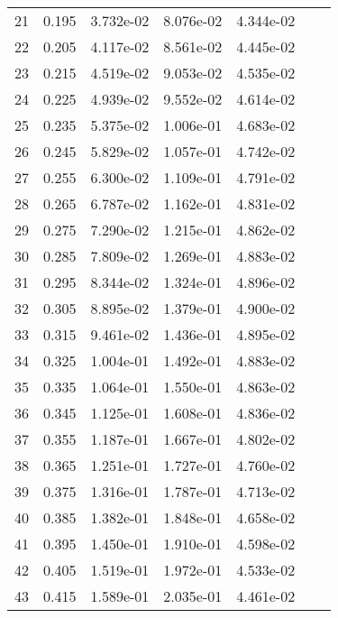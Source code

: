 \begin{table}[ht]
\begin{tabular}{rcccccc}
    21 &  0.195 &       3.732e-02 &       8.076e-02  &        4.344e-02\\ 
    22 &  0.205 &       4.117e-02 &       8.561e-02  &        4.445e-02\\ 
    23 &  0.215 &       4.519e-02 &       9.053e-02  &        4.535e-02\\ 
    24 &  0.225 &       4.939e-02 &       9.552e-02  &        4.614e-02\\ 
    25 &  0.235 &       5.375e-02 &       1.006e-01  &        4.683e-02\\ 
    26 &  0.245 &       5.829e-02 &       1.057e-01  &        4.742e-02\\ 
    27 &  0.255 &       6.300e-02 &       1.109e-01  &        4.791e-02\\ 
    28 &  0.265 &       6.787e-02 &       1.162e-01  &        4.831e-02\\ 
    29 &  0.275 &       7.290e-02 &       1.215e-01  &        4.862e-02\\ 
    30 &  0.285 &       7.809e-02 &       1.269e-01  &        4.883e-02\\ 
    31 &  0.295 &       8.344e-02 &       1.324e-01  &        4.896e-02\\ 
    32 &  0.305 &       8.895e-02 &       1.379e-01  &        4.900e-02\\ 
    33 &  0.315 &       9.461e-02 &       1.436e-01  &        4.895e-02\\ 
    34 &  0.325 &       1.004e-01 &       1.492e-01  &        4.883e-02\\ 
    35 &  0.335 &       1.064e-01 &       1.550e-01  &        4.863e-02\\ 
    36 &  0.345 &       1.125e-01 &       1.608e-01  &        4.836e-02\\ 
    37 &  0.355 &       1.187e-01 &       1.667e-01  &        4.802e-02\\ 
    38 &  0.365 &       1.251e-01 &       1.727e-01  &        4.760e-02\\ 
    39 &  0.375 &       1.316e-01 &       1.787e-01  &        4.713e-02\\ 
    40 &  0.385 &       1.382e-01 &       1.848e-01  &        4.658e-02\\ 
    41 &  0.395 &       1.450e-01 &       1.910e-01  &        4.598e-02\\ 
    42 &  0.405 &       1.519e-01 &       1.972e-01  &        4.533e-02\\ 
    43 &  0.415 &       1.589e-01 &       2.035e-01  &        4.461e-02\\ 

\end{tabular}
\end{table}
